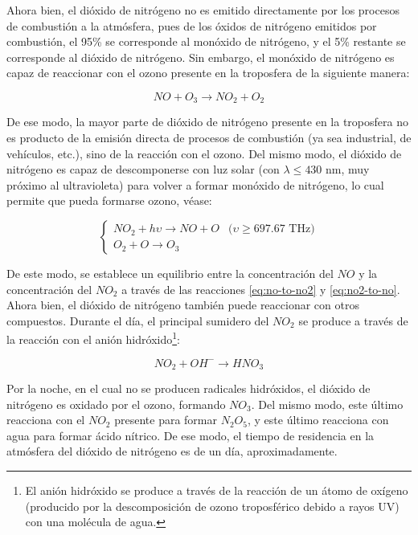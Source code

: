 \documentclass[12pt]{article}
\begin{document}
Ahora bien, el dióxido de nitrógeno no es emitido directamente por los procesos de combustión a la atmósfera, pues de los óxidos de nitrógeno emitidos por combustión, el 95\% se corresponde al monóxido de nitrógeno, y el 5\% restante se corresponde al dióxido de nitrógeno. Sin embargo, el monóxido de nitrógeno es capaz de reaccionar con el ozono presente en la troposfera de la siguiente manera:

\begin{equation}
NO + O_{3} \rightarrow NO_{2} + O_{2}
\label{eq:no-to-no2}
\end{equation}

De ese modo, la mayor parte de dióxido de nitrógeno presente en la troposfera no es producto de la emisión directa de procesos de combustión (ya sea industrial, de vehículos, etc.), sino de la reacción con el ozono. Del mismo modo, el dióxido de nitrógeno es capaz de descomponerse con luz solar (con $\lambda \leq 430$ nm, muy próximo al ultravioleta) para volver a formar monóxido de nitrógeno, lo cual permite que pueda formarse ozono, véase:

\begin{equation}
\begin{cases}
NO_{2} + h\upsilon \rightarrow NO + O &\text{($\upsilon \geq 697.67$ THz)}\\
O_{2} + O \rightarrow O_{3} & 
\end{cases} 
\label{eq:no2-to-no}
\end{equation}

De este modo, se establece un equilibrio entre la concentración del $NO$ y la concentración del $NO_{2}$ a través de las reacciones \ref{eq:no-to-no2} y \ref{eq:no2-to-no}. Ahora bien, el dióxido de nitrógeno también puede reaccionar con otros compuestos. Durante el día, el principal sumidero del $NO_{2}$ se produce a través de la reacción con el anión hidróxido\footnote{El anión hidróxido se produce a través de la reacción de un átomo de oxígeno (producido por la descomposición de ozono troposférico debido a rayos UV) con una molécula de agua.}:

\begin{equation}
NO_{2} + OH^{-} \rightarrow HNO_{3}
\label{eq:no2-to-hno3}
\end{equation}

Por la noche, en el cual no se producen radicales hidróxidos, el dióxido de nitrógeno es oxidado por el ozono, formando $NO_{3}$. Del mismo modo, este último reacciona con el $NO_{2}$ presente para formar $N_{2}O_{5}$, y este último reacciona con agua para formar ácido nítrico. De ese modo, el tiempo de residencia en la atmósfera del dióxido de nitrógeno es de un día, aproximadamente.
\end{document}
